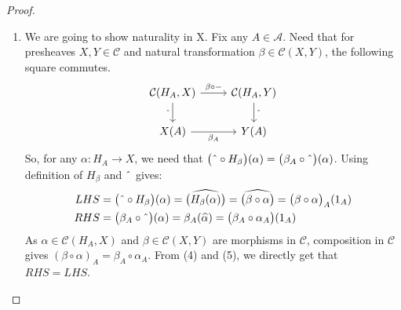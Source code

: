 \documentclass[18pt,a4paper]{article}
\theoremstyle{definition}
\begin{document}
\begin{proof}
\begin{enumerate}[label=\Roman*]
\begin{enumerate}[label=(\roman*)]
	\item We are going to show naturality in X. Fix any $A \in \mathcal{A}$. Need that for
		presheaves $X,Y \in \mathcal{C}$ and
		natural transformation $\beta \in \mathcal{C} (X,Y)$, the following
		square commutes.
		\begin{equation*}
		\begin{tikzcd}
			\mathcal{C}(H_A,X) \arrow[swap]{d}{ \string ^}
			\arrow{r}{\beta \circ -}
			& \mathcal{C}(H_A,Y) \arrow{d}{\string ^}\\
			X(A) \arrow[swap]{r}{\beta_A}
			& Y(A)
		\end{tikzcd}
		\end{equation*}
		So, for any $\alpha:H_A \to X$, we need that
		$\big( \string ^ \circ H_\beta \big)(\alpha) = \big( \beta_A \circ \string ^
		\big)(\alpha)$. Using definition of $H_\beta$ and $\string ^$ gives:
		\begin{align}
			LHS & = \big( \string ^ \circ H_\beta \big)(\alpha) =
			\widehat{\big(  H_\beta(\alpha)\big)}=
			\widehat{\big(  \beta \circ \alpha\big)}
			=\big(  \beta \circ \alpha\big)_A(1_A) \\
			RHS & = \big( \beta_A \circ \string ^ \big)(\alpha)
			= \beta_A (\widehat{\alpha}) =\big( \beta_A \circ \alpha_A\big)(1_A)
		\end{align}
		As $\alpha \in \mathcal{C} (H_A,X)$ and $\beta \in \mathcal{C}(X,Y)$
		are morphisms in $\mathcal{C}$, composition in $\mathcal{C}$ gives
		$(\beta \circ \alpha)_A = \beta_A \circ \alpha_A$. From (4) and (5), we
		directly get that $RHS=LHS$.


\end{enumerate}
\end{enumerate}
\end{proof}
\end{document}
